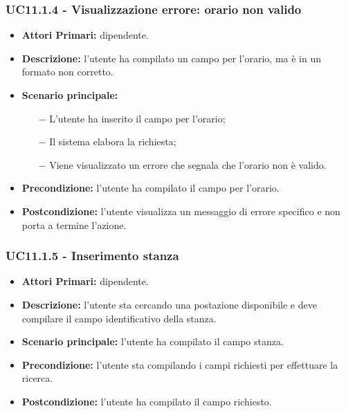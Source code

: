 \subsubsection{ UC11.1.4 - Visualizzazione errore: orario non valido }
\begin{itemize}
	\item\textbf{Attori Primari:} dipendente.
	\item\textbf{Descrizione:} l’utente ha compilato un campo per l'orario, ma è in un formato non corretto.
	\item\textbf{Scenario principale:} 
	\begin{itemize}
		\item[$-$] L’utente ha inserito il campo per l'orario;
		\item[$-$] Il sistema elabora la richiesta;
		\item[$-$] Viene visualizzato un errore che segnala che l'orario non è valido.
	\end{itemize}
	\item\textbf{Precondizione:} l’utente ha compilato il campo per l'orario.
	\item\textbf{Postcondizione:} l’utente visualizza un messaggio di errore specifico e non porta a termine l’azione.
\end{itemize}
\subsubsection{ UC11.1.5 - Inserimento stanza }
\begin{itemize}
	\item\textbf{Attori Primari:} dipendente.
	\item\textbf{Descrizione:} l’utente sta cercando una postazione disponibile e deve compilare il campo identificativo della stanza.
	\item\textbf{Scenario principale:} l’utente ha compilato il campo stanza.
	\item\textbf{Precondizione:} l’utente sta compilando i campi richiesti per effettuare la ricerca.
	\item\textbf{Postcondizione:} l’utente ha compilato il campo richiesto.
\end{itemize}
